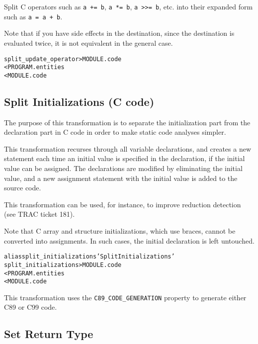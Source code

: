 \documentclass[a4paper]{report}
\newenvironment{PipsMake}{\begin{alltt}}{\end{alltt}}
\newenvironment{PipsPass}[1]{\label{pass:#1}}{}
\begin{document}
\begin{PipsPass}{split_update_operator}
  Split C operators such as \verb/a += b/, \verb/a *= b/, \verb/a >>= b/,
  etc. into their expanded form such as \verb/a = a + b/.
\end{PipsPass}

Note that if you have side effects in the destination, since the
destination is evaluated twice, it is not equivalent in the general case.

\begin{PipsMake}
split_update_operator > MODULE.code
        < PROGRAM.entities
        < MODULE.code
\end{PipsMake}


\subsection{Split Initializations (C code)}

\begin{PipsPass}{split_initializations}
The purpose of this transformation is to separate the initialization
part from the declaration part in C code in order to make static code
analyses simpler.
\end{PipsPass}

This transformation recurses through all variable declarations, and
creates a new statement each time an initial value is specified in the
declaration, if the initial value can be assigned. The declarations
are modified by eliminating the initial value, and a new assignment
statement with the initial value is added to the source code.

This transformation can be used, for instance, to improve reduction
detection (see TRAC ticket 181).

Note that C array and structure initializations, which use braces,
cannot be converted into assignments. In such cases, the initial
declaration is left untouched.

\begin{PipsMake}
alias split_initializations 'Split Initializations'
split_initializations > MODULE.code
        < PROGRAM.entities
        < MODULE.code
\end{PipsMake}

This transformation uses the \verb/C89_CODE_GENERATION/ property to
generate either C89 or C99 code.



\subsection{Set Return Type}
\label{subsec:set-return-type}
\end{document}
